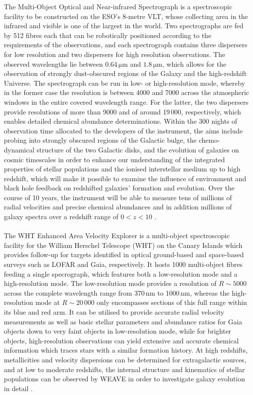 \documentclass[a4paper,11pt]{article}
\begin{document}
The Multi-Object Optical and Near-infrared Spectrograph \citep[MOONS;][]{moons2,moons1} is a spectroscopic facility to be constructed on the ESO's 8-metre VLT, whose collecting area in the infrared and visible is one of the largest in the world. Two spectrographs are fed by 512 fibres each that can be robotically positioned according to the requirements of the observations, and each spectrograph contains three dispersers for low resolution and two dispersers for high resolution observations. The observed wavelengths lie between $0.64\,\mathrm{\mu m}$ and $1.8\,\mathrm{\mu m}$, which allows for the observation of strongly dust-obscured regions of the Galaxy and the high-redshift Universe. The spectrograph can be run in low- or high-resolution mode, whereby in the former case the resolution is between 4000 and 7000 across the atmospheric windows in the entire covered wavelength range. For the latter, the two dispersers provide resolutions of more than 9000 and of around 19\,000, respectively, which enables detailed chemical abundance determinations. Within the 300 nights of observation time allocated to the developers of the instrument, the aims include probing into strongly obscured regions of the Galactic bulge, the chemo-dynamical structure of the two Galactic disks, and the evolution of galaxies on cosmic timescales in order to enhance our understanding of the integrated properties of stellar populations and the ionised interstellar medium up to high redshift, which will make it possible to examine the influence of environment and black hole feedback on redshifted galaxies' formation and evolution. Over the course of 10 years, the instrument will be able to measure tens of millions of radial velocities and precise chemical abundances and in addition millions of galaxy spectra over a redshift range of $0<z<10$ \citep{moons2}.\\ \\
%
The WHT Enhanced Area Velocity Explorer \citep[WEAVE;][]{weave2,weave1} is a multi-object spectroscopic facility for the William Herschel Telescope (WHT) on the Canary Islands which provides follow-up for targets identified in optical ground-based and space-based surveys such as LOFAR and Gaia, respectively. It hosts 1000 multi-object fibres feeding a single specrograph, which features both a low-resolution mode and a high-resolution mode. The low-resolution mode provides a resolution of $R\sim5000$ across the complete wavelength range from 370\,nm to 1000\,nm, whereas the high-resolution mode at $R\sim20\,000$ only encompasses sections of this full range within its blue and red arm. It can be utilised to provide accurate radial velocity measurements as well as basic stellar parameters and abundance ratios for Gaia objects down to very faint objects in low-resolution mode, while for brighter objects, high-resolution observations can yield extensive and accurate chemical information which traces stars with a similar formation history. At high redshifts, metallicities and velocity dispersions can be determined for extragalactic sources, and at low to moderate redshifts, the internal structure and kinematics of stellar populations can be observed by WEAVE in order to investigate galaxy evolution in detail \citep{weave2}.\\ \\
\end{document}
